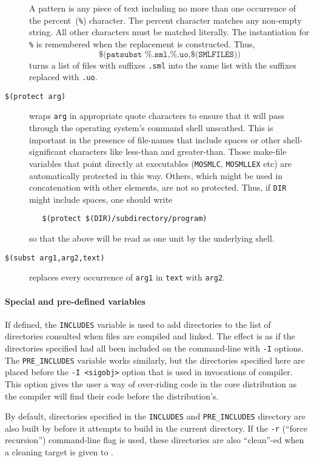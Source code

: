 \begin{description}
  A pattern is any piece of text including no more than one occurrence
  of the percent~(\texttt{\%}) character.  The percent character
  matches any non-empty string.  All other characters must be matched
  literally.  The instantiation for \texttt{\%} is remembered when the
  replacement is constructed.  Thus, \[
    \texttt{\$(patsubst \%.sml,\%.uo,\$(SMLFILES))}
   \] turns a list of files with suffixes \texttt{.sml} into the same
  list with the suffixes replaced with \texttt{.uo}.
\item[\texttt{\$(protect arg)}] wraps \texttt{arg} in appropriate
  quote characters to ensure that it will pass through the operating
  system's command shell unscathed.  This is important in the presence
  of file-names that include spaces or other shell-significant
  characters like less-than and greater-than.  Those make-file
  variables that point directly at executables (\texttt{MOSMLC},
  \texttt{MOSMLLEX} etc) are automatically protected in this way.
  Others, which might be used in concatenation with other elements,
  are not so protected.  Thus, if \texttt{DIR} might include spaces,
  one should write
\begin{verbatim}
   $(protect $(DIR)/subdirectory/program)
\end{verbatim}
  so that the above will be read as one unit by the underlying shell.
\item[\texttt{\$(subst arg1,arg2,text)}] replaces every occurrence
  of \texttt{arg1} in \texttt{text} with \texttt{arg2}.
\end{description}

\paragraph{Special and pre-defined variables}

If defined, the \texttt{INCLUDES} variable is used to add directories to the list of directories consulted when files are compiled and linked.
The effect is as if the directories specified had all been included on the command-line with \texttt{-I} options.
The \texttt{PRE\_INCLUDES} variable works similarly, but the directories specified here are placed before the \mbox{\texttt{-I <sigobj>}} option that is used in invocations of compiler.
This option gives the user a way of over-riding code in the core distribution as the compiler will find their code before the distribution's.

By default, directories specified in the \texttt{INCLUDES} and \texttt{PRE\_INCLUDES} directory are also built by \holmake{} before it attempts to build in the current directory.
If the \texttt{-r} (``force recursion'') command-line flag is used, these directories are also ``clean''-ed when a cleaning target is given to \holmake{}.

